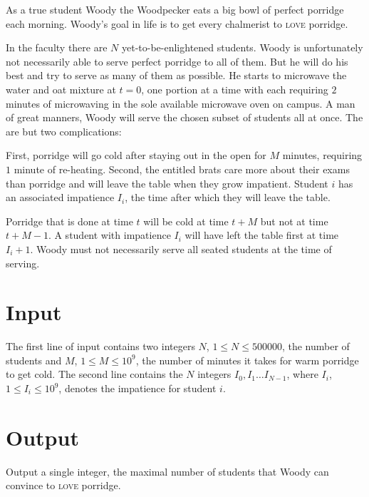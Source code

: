 As a true student Woody the Woodpecker eats a big bowl of perfect porridge each morning. Woody’s goal in life is to get every chalmerist to \textsc{love} porridge.

In the faculty there are $N$ yet-to-be-enlightened students. Woody is unfortunately not necessarily able to serve perfect porridge to all of them. But he will do his best and try to serve as many of them as possible. He starts to microwave the water and oat mixture at $t=0$, one portion at a time with each requiring $2$ minutes of microwaving in the sole available microwave oven on campus. A man of great manners, Woody will serve the chosen subset of students all at once. The are but two complications:

First, porridge will go cold after staying out in the open for $M$ minutes, requiring $1$ minute of re-heating. Second, the entitled brats care more about their exams than porridge and will leave the table when they grow impatient. Student $i$ has an associated impatience $I_i$, the time after which they will leave the table.

Porridge that is done at time $t$ will be cold at time $t+M$ but not at time $t+M-1$. A student with impatience $I_i$ will have left the table first at time $I_i+1$. Woody must not necessarily serve all seated students at the time of serving.

\section*{Input}
The first line of input contains two integers $N$, $1 \leq N \leq 500000$, the number of students and $M$, $1 \leq M \leq 10^9$, the number of minutes it takes for warm porridge to get cold. The second line contains the $N$ integers $I_0, I_1 \ldots I_{N-1}$, where $I_i$, $1 \leq I_i \leq 10^9$, denotes the impatience for student $i$.


\section*{Output}
Output a single integer, the maximal number of students that Woody can convince to \textsc{love} porridge.
